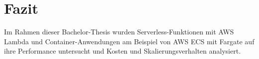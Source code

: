 \chapter{Fazit}
Im Rahmen dieser Bachelor-Thesis wurden Serverless-Funktionen mit AWS Lambda und Container-Anwendungen am Beispiel von AWS ECS mit Fargate auf ihre Performance untersucht und Kosten und Skalierungsverhalten analysiert. 